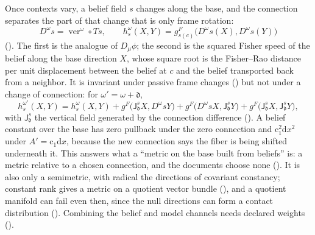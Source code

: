 Once contexts vary, a belief field \(s\) changes along the base, and the connection separates the part of
that change that is only frame rotation:
\[
D^\omega s=\operatorname{ver}^\omega\circ Ts,
\qquad
h^\omega_s(X,Y)=g^F_{s(c)}\bigl(D^\omega s(X),D^\omega s(Y)\bigr)
\]
(). The first is the analogue of \(D_\mu\phi\); the second is the squared
Fisher speed of the belief along the base direction \(X\), whose square root is the Fisher--Rao distance per
unit displacement between the belief at \(c\) and the belief transported back from a neighbor. It is invariant under passive frame
changes () but not under a change of connection: for
\(\omega'=\omega+\mathfrak d\),
\[
h^{\omega'}_s(X,Y)=h^\omega_s(X,Y)
+g^F\bigl(\mathsf J^s_{\mathfrak d}X,D^\omega sY\bigr)
+g^F\bigl(D^\omega sX,\mathsf J^s_{\mathfrak d}Y\bigr)
+g^F\bigl(\mathsf J^s_{\mathfrak d}X,\mathsf J^s_{\mathfrak d}Y\bigr),
\]
with \(\mathsf J^s_{\mathfrak d}\) the vertical field generated by the connection difference
(). A belief constant over the base has zero pullback under the zero
connection and \(\mathrm c_1^2\mathrm dx^2\) under \(A'=\mathrm c_1\mathrm dx\), because the new connection
says the fiber is being shifted underneath it. This answers what a ``metric on the base built from beliefs'' is: a
metric relative to a chosen connection, and the documents choose none
(). It is also only a semimetric, with radical the directions of
covariant constancy; constant rank gives a metric on a quotient vector bundle
(), and a quotient manifold can fail even then, since the null directions
can form a contact distribution (). Combining the belief and model
channels needs declared weights ().

